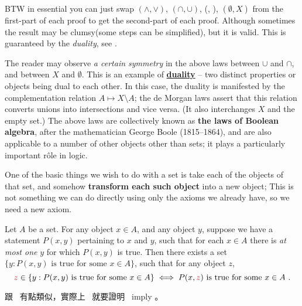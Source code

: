 \begin{note}
BTW in essential you can just swap \((\land, \lor)\), \((\cap, \cup)\), (, ), \((\emptyset, X)\) from the first-part of each proof to get the second-part of each proof.
Although sometimes the result may be clumsy(some steps can be simplified), but it is valid.
This is guaranteed by the \emph{duality}, see .
\end{note}

\begin{remark} \label{remark 3.1.30}
The reader may observe \emph{a certain symmetry} in the above laws between \(\cup\) and \(\cap\), and between \(X\) and \(\emptyset\).
This is an example of \href{https://www.wikiwand.com/en/Duality_(mathematics)}{\textbf{duality}} -- two distinct properties or objects being dual to each other. In this case, the duality is manifested by the complementation relation \(A \mapsto X \setminus A \);
the de Morgan laws assert that this relation converts unions into intersections and vice versa. (It also interchanges \(X\) and the empty set.)
The above laws are collectively known as \textbf{the laws of Boolean algebra}, after the mathematician George Boole (1815–1864), and are also applicable to a number of other objects other than sets;
it plays a particularly important r\^{o}le in logic.
\end{remark}

\begin{note}
One of the basic things we wish to do with a set is take each of the objects of that set, and somehow \textbf{transform each such object} into a new object;
This is not something we can do directly using only the axioms we already have, so we need a new axiom.
\end{note}

\begin{axiom} [Replacement] \label{axm 3.6}
Let \(A\) be a set. For any object \(x \in A\), and any object \(y\), suppose we have a statement \(P(x, y)\) pertaining to \(x\) and \(y\), such that for each \(x \in A\) there is \emph{at most one} \(y\) for which \(P(x, y)\) is true.
Then there exists a set \( \{y : P(x, y) \text{\ is true for some\ } x \in A \} \), such that for any object \(z\),
\[
\MAROON{z} \in \{ y : P(x, y) \text{\ is true for some\ } x \in A \} \iff P(x, \MAROON{z}) \text{\ is true for some \(x \in A\) }.
\]
\end{axiom}

\begin{note}
 跟\  有點類似，實際上\  就要證明\  imply 。
\end{note}

